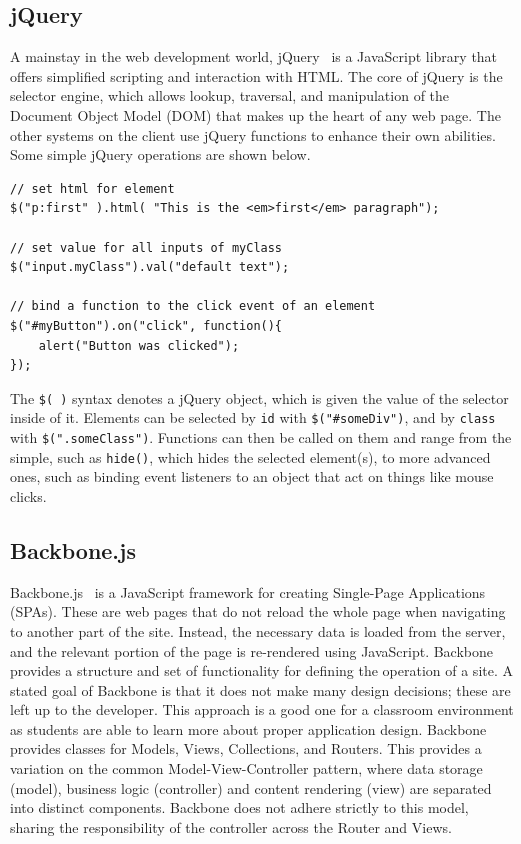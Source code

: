 \documentclass[12pt]{article}
\newcommand{\code}[1]{{\texttt {#1}}}
\begin{document}
\subsection{jQuery}\label{sec:jquery}
A mainstay in the web development world, jQuery~\cite{jQuery} is a JavaScript library that offers simplified scripting and interaction with HTML. The core of jQuery is the selector engine, which allows lookup, traversal, and manipulation of the Document Object Model (DOM) that makes up the heart of any web page. The other systems on the client use jQuery functions to enhance their own abilities. Some simple jQuery operations are shown below.
\begin{verbatim}
// set html for element
$("p:first" ).html( "This is the <em>first</em> paragraph");

// set value for all inputs of myClass
$("input.myClass").val("default text");

// bind a function to the click event of an element
$("#myButton").on("click", function(){
    alert("Button was clicked");
});
\end{verbatim}
The \code{\$( )} syntax denotes a jQuery object, which is given the value of the selector inside of it. Elements can be selected by \code{id} with \code{\$("#someDiv")}, and by \code{class} with \code{\$(".someClass")}.
Functions can then be called on them and range from the simple, such as \code{hide()}, which hides the selected element(s), to more advanced ones, such as binding event listeners to an object that act on things like mouse clicks.


\subsection{Backbone.js}\label{sec:backbone}
Backbone.js~\cite{Backbone} is a JavaScript framework for creating Single-Page Applications (SPAs). These are web pages that do not reload the whole page when navigating to another part of the site. Instead, the necessary data is loaded from the server, and the relevant portion of the page is re-rendered using JavaScript. Backbone provides a structure and set of functionality for defining the operation of a site. A stated goal of Backbone is that it does not make many design decisions; these are left up to the developer. This approach is a good one for a classroom environment as students are able to learn more about proper application design. Backbone provides classes for Models, Views, Collections, and Routers. This provides a variation on the common Model-View-Controller pattern, where data storage (model), business logic (controller) and content rendering (view) are separated into distinct components. Backbone does not adhere strictly to this model, sharing the responsibility of the controller across the Router and Views.
\end{document}
